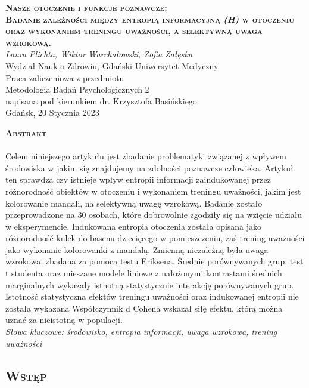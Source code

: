 \documentclass[12pt,a4paper,final,oneside,onecolumn,titlepage]{article}
\begin{document}
\pagestyle{fancy}
\fancyhead{}
\fancyfoot{}
\rhead{\thepage}

\begin{titlepage}
  \thispagestyle{empty}
  \rhead{\thepage}
  \begin{center}
  \vspace*{1cm}
  \Large
  \textbf{\textsc{Nasze otoczenie i funkcje poznawcze:\\ Badanie zależności między entropią informacyjną \textit{(H)} w otoczeniu oraz wykonaniem treningu uważności, a selektywną uwagą wzrokową.\\}}
  \vspace{1.5cm}
  \textit{Laura Plichta, Wiktor Warchałowski, Zofia Załęska\\}
  Wydział Nauk o Zdrowiu, Gdański Uniwersytet Medyczny\\
  \vspace{3cm}
  Praca zaliczeniowa z przedmiotu \\ Metodologia Badań Psychologicznych 2 \\ napisana pod kierunkiem dr. Krzysztofa Basińskiego\\
  \vspace{3cm}
  Gdańsk, 20 Stycznia 2023
  \end{center}
\end{titlepage}
\begin{center}
  \vspace*{0.5cm}
  \large{\textbf{\textsc{Abstrakt}}}
\end{center}
\paragraph{}
Celem niniejszego artykułu jest zbadanie problematyki związanej z wpływem środowiska w jakim się znajdujemy na zdolności poznawcze człowieka. Artykuł ten sprawdza czy istnieje wpływ entropii informacji zaindukowanej przez różnorodność obiektów w otoczeniu i wykonaniem treningu uważności, jakim jest kolorowanie mandali, na selektywną uwagę wzrokową. Badanie zostało przeprowadzone na 30 osobach, które dobrowolnie zgodziły się na wzięcie udziału w eksperymencie. Indukowana entropia otoczenia została opisana jako różnorodność kulek do basenu dziecięcego w pomieszczeniu, zaś trening uważności jako wykonanie kolorowanki z mandalą. Zmienną niezależną była uwaga wzrokowa, zbadana za pomocą testu Eriksena. Średnie porównywanych grup, test t studenta oraz mieszane modele liniowe z nałożonymi kontrastami średnich marginalnych wykazały istnotną statystycznie interakcję porównywanych grup. Istotność statystyczna efektów treningu uważności oraz indukowanej entropii nie została wykazana Współczynnik d Cohena wskazał siłę efektu, którą można uznać za nieistotną w populacji.
\\
\textit{Słowa kluczowe: środowisko, entropia informacji, uwaga wzrokowa, trening uważności}
\newpage
\begin{center}
\section*{\large{\textbf{\textsc{Wstęp}}}}
\end{center}
\end{document}

